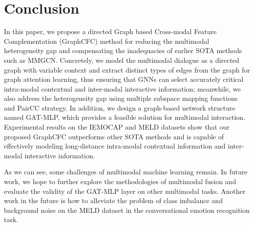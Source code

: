 \documentclass[lettersize,journal]{IEEEtran}
\begin{document}
\section{Conclusion}\label{sec:conclusion}
In this paper, we propose a directed Graph based Cross-modal Feature Complementation (GraphCFC) method for reducing the multimodal heterogeneity gap and compensating the inadequacies of earlier SOTA methods such as MMGCN. Concretely, we model the multimodal dialogue as a directed graph with variable context and extract distinct types of edges from the graph for graph attention learning, thus ensuring that GNNs can select accurately critical intra-modal contextual and inter-modal interactive information; meanwhile, we also address the heterogeneity gap using multiple subspace mapping functions and PairCC strategy. In addition, we design a graph-based network structure named GAT-MLP, which provides a feasible solution for multimodal interaction. Experimental results on the IEMOCAP and MELD datasets show that our proposed GraphCFC outperforms other SOTA methods and is capable of effectively modeling long-distance intra-modal contextual information and inter-modal interactive information. 

As we can see, some challenges of multimodal machine learning remain. In future work, we hope to further explore the methodologies of multimodal fusion and evaluate the validity of the GAT-MLP layer on other multimodal tasks. Another work in the future is how to alleviate the problem of class imbalance and background noise on the MELD dataset in the conversational emotion recognition task.


\balance

\end{document}
